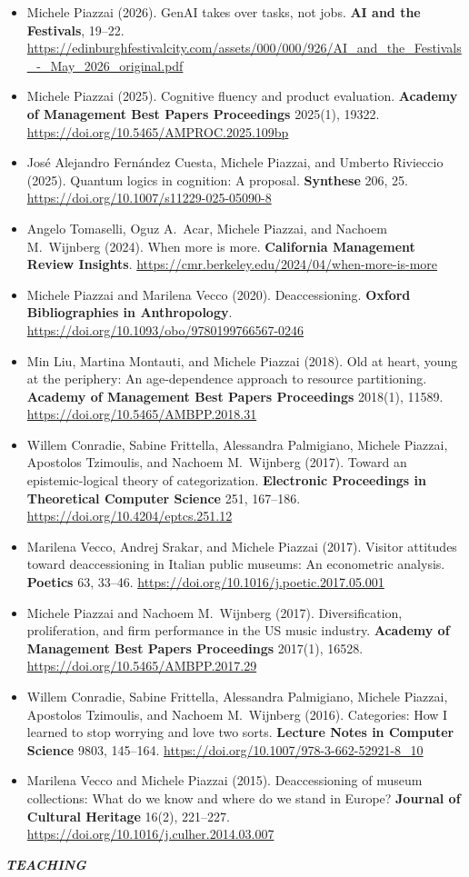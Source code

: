 \documentclass[a4paper]{article}
\newenvironment{cvpubs}{\begin{itemize}[nosep,leftmargin=0em,itemsep=\smallskipamount]}{\end{itemize}\medskip}
\newcommand\cvsection[1]{\medskip\textbf{\Large\itshape\uppercase{#1}}\hspace{.5em}\hrulefill\par\medskip}
\newcommand\cvpub[6][.]{\item[] {#2 (#3). #4#1 #5. \url{https://#6}}}
\begin{document}
\begin{cvpubs}
  \cvpub{Michele Piazzai}{2026}{GenAI takes over tasks, not jobs}{\textbf{AI and the Festivals}, 19--22}{edinburghfestivalcity.com/assets/000/000/926/AI_and_the_Festivals_-_May_2026_original.pdf}
  \cvpub{Michele Piazzai}{2025}{Cognitive fluency and product evaluation}{\textbf{Academy of Management Best Papers Proceedings} 2025(1), 19322}{doi.org/10.5465/AMPROC.2025.109bp}
  \cvpub{José Alejandro Fernández Cuesta, Michele Piazzai, and Umberto Rivieccio}{2025}{Quantum logics in cognition: A proposal}{\textbf{Synthese} 206, 25}{doi.org/10.1007/s11229-025-05090-8}
  \cvpub{Angelo Tomaselli, Oguz A.\ Acar, Michele Piazzai, and Nachoem M.\ Wijnberg}{2024}{When more is more}{\textbf{California Management Review Insights}}{cmr.berkeley.edu/2024/04/when-more-is-more}
  \cvpub{Michele Piazzai and Marilena Vecco}{2020}{Deaccessioning}{\textbf{Oxford Bibliographies in Anthropology}}{doi.org/10.1093/obo/9780199766567-0246}
  \cvpub{Min Liu, Martina Montauti, and Michele Piazzai}{2018}{Old at heart, young at the periphery: An age-dependence approach to resource partitioning}{\textbf{Academy of Management Best Papers Proceedings} 2018(1), 11589}{doi.org/10.5465/AMBPP.2018.31}
  \cvpub{Willem Conradie, Sabine Frittella, Alessandra Palmigiano, Michele Piazzai, Apostolos Tzimoulis, and Nachoem M.\ Wijnberg}{2017}{Toward an epistemic-logical theory of categorization}{\textbf{Electronic Proceedings in Theoretical Computer Science} 251, 167--186}{doi.org/10.4204/eptcs.251.12}
  \cvpub{Marilena Vecco, Andrej Srakar, and Michele Piazzai}{2017}{Visitor attitudes toward deaccessioning in Italian public museums: An econometric analysis}{\textbf{Poetics} 63, 33--46}{doi.org/10.1016/j.poetic.2017.05.001}
  \cvpub{Michele Piazzai and Nachoem M.\ Wijnberg}{2017}{Diversification, proliferation, and firm performance in the US music industry}{\textbf{Academy of Management Best Papers Proceedings} 2017(1), 16528}{doi.org/10.5465/AMBPP.2017.29}
  \cvpub{Willem Conradie, Sabine Frittella, Alessandra Palmigiano, Michele Piazzai, Apostolos Tzimoulis, and Nachoem M.\ Wijnberg}{2016}{Categories: How I learned to stop worrying and love two sorts}{\textbf{Lecture Notes in Computer Science} 9803, 145--164}{doi.org/10.1007/978-3-662-52921-8\_10}
  \cvpub[?]{Marilena Vecco and Michele Piazzai}{2015}{Deaccessioning of museum collections: What do we know and where do we stand in Europe}{\textbf{Journal of Cultural Heritage} 16(2), 221--227}{doi.org/10.1016/j.culher.2014.03.007}
\end{cvpubs}
\cvsection{Teaching}
\end{document}
